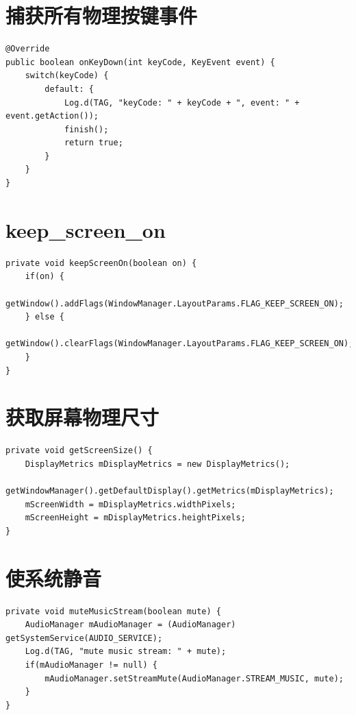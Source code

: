 ﻿\documentclass[a4paper,11pt]{article}
\begin{document}
  \section[捕获所有物理按键事件]{捕获所有物理按键事件}
  \begin{verbatim}
@Override
public boolean onKeyDown(int keyCode, KeyEvent event) {
    switch(keyCode) {
        default: {
            Log.d(TAG, "keyCode: " + keyCode + ", event: " + event.getAction());
            finish();
            return true;
        }
    }
}
  \end{verbatim}

  \section[keep\_screen\_on]{keep\_screen\_on}
  \begin{verbatim}
private void keepScreenOn(boolean on) {
    if(on) {
        getWindow().addFlags(WindowManager.LayoutParams.FLAG_KEEP_SCREEN_ON);
    } else {
        getWindow().clearFlags(WindowManager.LayoutParams.FLAG_KEEP_SCREEN_ON);
    }
}
  \end{verbatim}

  \section[获取屏幕物理尺寸]{获取屏幕物理尺寸}
  \begin{verbatim}
private void getScreenSize() {
    DisplayMetrics mDisplayMetrics = new DisplayMetrics();
    getWindowManager().getDefaultDisplay().getMetrics(mDisplayMetrics);
    mScreenWidth = mDisplayMetrics.widthPixels;
    mScreenHeight = mDisplayMetrics.heightPixels;
}
  \end{verbatim}

  \section[使系统静音]{使系统静音}
  \begin{verbatim}
private void muteMusicStream(boolean mute) {
    AudioManager mAudioManager = (AudioManager) getSystemService(AUDIO_SERVICE);
    Log.d(TAG, "mute music stream: " + mute);
    if(mAudioManager != null) {
        mAudioManager.setStreamMute(AudioManager.STREAM_MUSIC, mute);
    }
}
  \end{verbatim}
\end{document}
